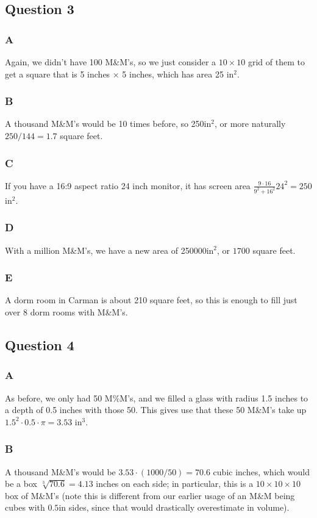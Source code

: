\documentclass[12pt,letterpaper]{article}
\theoremstyle{definition}
\begin{document}
\subsection*{Question 3}

\subsubsection*{A}
Again, we didn't have 100 M\&M's, so we just consider a $10\times10$ grid of them to get a square that is 5 inches $\times$ 5 inches, which has area 25 in$^2$.
\subsubsection*{B}
A thousand M\&M's would be 10 times before, so 250in$^{2}$, or more naturally $250/144 = 1.7$ square feet.
\subsubsection*{C}
If you have a 16:9 aspect ratio 24 inch monitor, it has screen area $\frac{9 \cdot 16}{9^{2} + 16^{2}} 24^{2} = 250$ in$^{2}$.
\subsubsection*{D}
With a million M\&M's, we have a new area of 250000in$^{2}$, or $1700$ square feet.
\subsubsection*{E}
A dorm room in Carman is about 210 square feet, so this is enough to fill just over 8 dorm rooms with M\&M's.

\subsection*{Question 4}

\subsubsection*{A}
As before, we only had 50 M\%M's, and we filled a glass with radius 1.5 inches to a depth of 0.5 inches with those 50. This gives use that these 50 M\&M's take up $1.5^{2} \cdot 0.5 \cdot \pi = 3.53$ in$^{3}$.
\subsubsection*{B}
A thousand M\&M's would be $3.53 \cdot (1000 / 50) = 70.6$ cubic inches, which would be a box $\sqrt[3]{70.6} = 4.13$ inches on each side; in particular, this is a $10 \times 10 \times 10$ box of M\&M's (note this is different from our earlier usage of an M\&M being cubes with $0.5 \text{in}$ sides, since that would drastically overestimate in volume).
\end{document}
